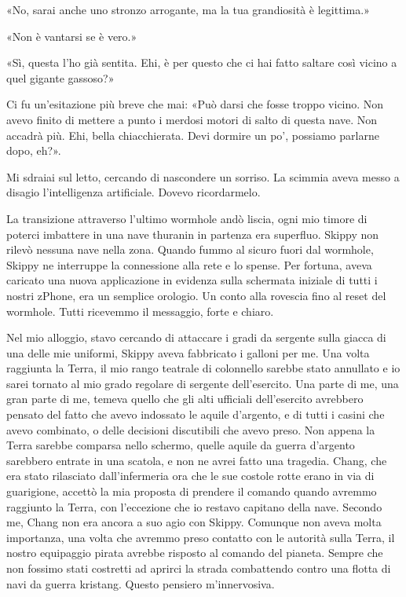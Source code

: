 «No, sarai anche uno stronzo arrogante, ma la tua grandiosità è
legittima.»

«Non è vantarsi se è vero.»

«Sì, questa l'ho già sentita. Ehi, è per questo che ci hai fatto saltare
così vicino a quel gigante gassoso?»

Ci fu un'esitazione più breve che mai: «Può darsi che fosse troppo
vicino. Non avevo finito di mettere a punto i merdosi motori di salto di
questa nave. Non accadrà più. Ehi, bella chiacchierata. Devi dormire un
po', possiamo parlarne dopo, eh?».

Mi sdraiai sul letto, cercando di nascondere un sorriso. La scimmia
aveva messo a disagio l'intelligenza artificiale. Dovevo ricordarmelo.

La transizione attraverso l'ultimo wormhole andò liscia, ogni mio timore
di poterci imbattere in una nave thuranin in partenza era superfluo.
Skippy non rilevò nessuna nave nella zona. Quando fummo al sicuro fuori
dal wormhole, Skippy ne interruppe la connessione alla rete e lo spense.
Per fortuna, aveva caricato una nuova applicazione in evidenza sulla
schermata iniziale di tutti i nostri zPhone, era un semplice orologio.
Un conto alla rovescia fino al reset del wormhole. Tutti ricevemmo il
messaggio, forte e chiaro.

\hfill\break

Nel mio alloggio, stavo cercando di attaccare i gradi da sergente sulla
giacca di una delle mie uniformi, Skippy aveva fabbricato i galloni per
me. Una volta raggiunta la Terra, il mio rango teatrale di colonnello
sarebbe stato annullato e io sarei tornato al mio grado regolare di
sergente dell'esercito. Una parte di me, una gran parte di me, temeva
quello che gli alti ufficiali dell'esercito avrebbero pensato del fatto
che avevo indossato le aquile d'argento, e di tutti i casini che avevo
combinato, o delle decisioni discutibili che avevo preso. Non appena la
Terra sarebbe comparsa nello schermo, quelle aquile da guerra d'argento
sarebbero entrate in una scatola, e non ne avrei fatto una tragedia.
Chang, che era stato rilasciato dall'infermeria ora che le sue costole
rotte erano in via di guarigione, accettò la mia proposta di prendere il
comando quando avremmo raggiunto la Terra, con l'eccezione che io
restavo capitano della nave. Secondo me, Chang non era ancora a suo agio
con Skippy. Comunque non aveva molta importanza, una volta che avremmo
preso contatto con le autorità sulla Terra, il nostro equipaggio pirata
avrebbe risposto al comando del pianeta. Sempre che non fossimo stati
costretti ad aprirci la strada combattendo contro una flotta di navi da
guerra kristang. Questo pensiero m'innervosiva.

